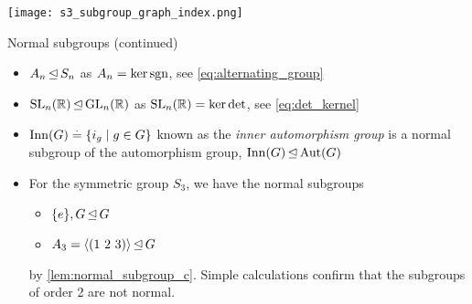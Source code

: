 \begin{marginfigure}
    \texttt{[image: s3\_subgroup\_graph\_index.png]}
    \caption{Subgroup graph of the symmetric group $S_3$. The index of the subgroups is shown in orange.}
\end{marginfigure}

\begin{ex}{Normal subgroups (continued)}{}
\begin{itemize}
    \item $A_n \operatorname*{\trianglelefteq} S_n$ as $A_n = \ker{\operatorname*{sgn}}$, see \cref{eq:alternating_group}
    \item $\mathrm{SL}_{n}(\mathbb{R}) \operatorname*{\trianglelefteq} \mathrm{GL}_{n}(\mathbb{R})$ as $\mathrm{SL}_{n}(\mathbb{R}) = \ker{\det}$, see \cref{eq:det_kernel}
    \item ${\mathrm{Inn}(G) \overset{.}{=} \{i_g \mid g \in G\}}$ known as the \emph{inner automorphism group} is a normal subgroup of the automorphism group, $\mathrm{Inn}(G) \operatorname*{\trianglelefteq} \mathrm{Aut}(G)$
    \item For the symmetric group $S_3$, we have the normal subgroups \begin{itemize}
        \item $\{e\}, G \operatorname*{\trianglelefteq} G$
        \item $A_3 = \langle (1\ 2\ 3) \rangle \operatorname*{\trianglelefteq} G$
    \end{itemize} by \cref{lem:normal_subgroup_c}. Simple calculations confirm that the subgroups of order 2 are not normal.
\end{itemize}
\end{ex}

